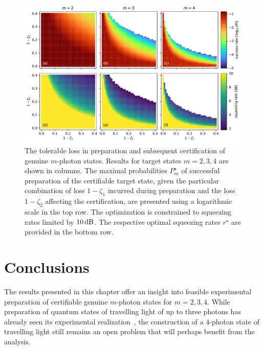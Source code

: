 \documentclass{article}
\begin{document}
\begin{figure}[h]
  \begin{center}
    \includegraphics[width = \columnwidth]{import/hierarchy_2-3-4_1000.pdf}
  \end{center}
  \caption{
    The tolerable loss in preparation and subsequent certification of genuine $m$-photon states. Results for target states $m = 2, 3, 4$ are shown in columns. The maximal probabilities $P_{m}^{\star}$ of successful preparation of the certifiable target state, given the particular combination of loss $1 - \zeta_{1}$ incurred during preparation and the loss $1 - \zeta_{2}$ affecting the certification, are presented using a logarithmic scale in the top row. The optimization is constrained to squeezing rates limited by $10\,\mathrm{dB}$. The respective optimal squeezing rates $r^{\star}$ are provided in the bottom row.
  }
  \label{f-otm-234}
\end{figure}


%
%

\FloatBarrier
\section{Conclusions}

The results presented in this chapter offer an insight into feasible experimental preparation of certifiable genuine $m$-photon states for $m = 2, 3, 4$. While preparation of quantum states of travelling light of up to three photons has already seen its experimental realization~\cite{yukawa2013a}, the construction of a $4$-photon state of travelling light still remains an open problem that will perhaps benefit from the analysis.

%
% 

\FloatBarrier
\printbibliography[heading = bibintoc]
\end{document}
